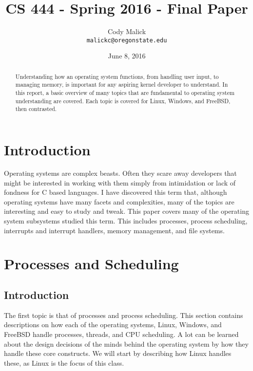 \documentclass[10pt,letterpaper,onecolumn,draftclsnofoot]{IEEEtran}
\begin{document}
\begin{titlepage}
  \title{CS 444 - Spring 2016 - Final Paper}
  \author{Cody Malick\\
  \texttt{malickc@oregonstate.edu}}
  \date{June 8, 2016}
  \maketitle
  \vspace*{4cm}
  \begin{abstract}
      \noindent Understanding how an operating system functions, from handling user
      input, to managing memory, is important for any aspiring kernel developer to
      understand. In this report, a basic overview of many topics that are fundamental
      to operating system understanding are covered. Each topic is covered for Linux,
      Windows, and FreeBSD, then contrasted.


  \end{abstract}
\end{titlepage}

\tableofcontents
\clearpage
\section{Introduction}
Operating systems are complex beasts. Often they scare away developers that might
be interested in working with them simply from intimidation or lack of fondness for
C based languages. I have discovered this term that, although operating systems have many facets and complexities, many of the topics are interesting and easy to study and tweak. This paper covers many of the operating system subsystems studied this term. This includes processes, process scheduling, interrupts and interrupt handlers, memory management, and file systems.

\section{Processes and Scheduling}

\subsection{Introduction}
The first topic is that of processes and process scheduling. This section
contains descriptions on how each of the operating systems, Linux, Windows,
and FreeBSD handle processes, threads, and CPU scheduling. A lot can be
learned about the design decisions of the minds behind the operating system by
how they handle these core constructs. We will start by describing how Linux
handles these, as Linux is the focus of this class.
\end{document}
